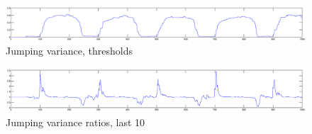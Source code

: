 \begin{figure}
\centering
  \includegraphics[width=1\textwidth]{./Figures/notes/jumping_variance_thresholds.eps}
  \caption[Jumping variance thresholds]{Jumping variance, thresholds}
\end{figure}

\begin{figure}
\centering
  \includegraphics[width=1\textwidth]{./Figures/notes/jumping_variance_ratios_10.eps}
  \caption[Jumping variance ratios]{Jumping variance ratios, last 10}
\end{figure}